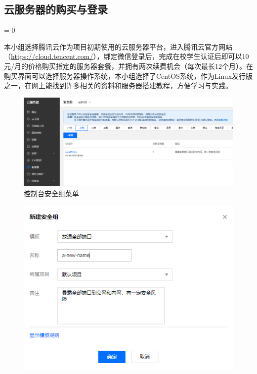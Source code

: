 \documentclass[a4paper,11pt]{ctexart}
\newcommand{\subpar}
{
	\par
	\hangafter = 0
	\setlength{\hangindent}{1em}
}
\begin{document}
\begin{spacing}{1.5}
\subsection{云服务器的购买与登录}
\subpar
本小组选择腾讯云作为项目初期使用的云服务器平台，进入腾讯云官方网站（\url{https://cloud.tencent.com/}），绑定微信登录后，完成在校学生认证后即可以10元/月的价格购买指定的服务器套餐，并拥有两次续费机会（每次最长12个月）。在购买界面可以选择服务器操作系统，本小组选择了CentOS系统，作为Linux发行版之一，在网上能找到许多相关的资料和服务器搭建教程，方便学习与实践。
\begin{figure}[h]
	\centering
	\setlength{\abovecaptionskip}{2mm}
	\setlength{\belowcaptionskip}{-2mm}
	\includegraphics[scale=0.35]{安全组1.png}
	\caption{控制台安全组菜单}\label{figure:安全组1}
\end{figure}
\begin{figure}[h]
	\centering
	\setlength{\abovecaptionskip}{2mm}
	\setlength{\belowcaptionskip}{-2mm}
	\includegraphics[scale=0.5]{安全组2.png}

\end{figure}
\end{spacing}
\end{document}
